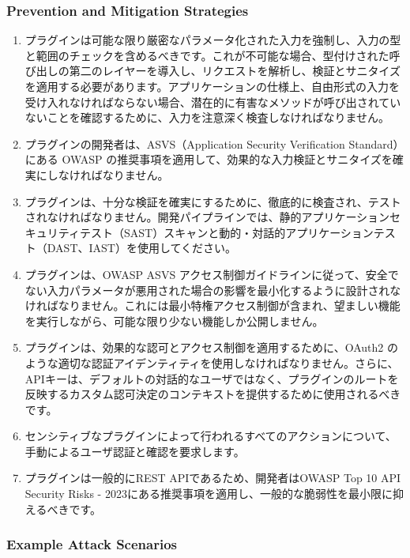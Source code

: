 \documentclass[
]{article}
\providecommand{\tightlist}{%
  \setlength{\itemsep}{0pt}\setlength{\parskip}{0pt}}
\begin{document}
\subsubsection{Prevention and Mitigation
Strategies}\label{prevention-and-mitigation-strategies}

\begin{enumerate}
\def\labelenumi{\arabic{enumi}.}
\tightlist
\item
  プラグインは可能な限り厳密なパラメータ化された入力を強制し、入力の型と範囲のチェックを含めるべきです。これが不可能な場合、型付けされた呼び出しの第二のレイヤーを導入し、リクエストを解析し、検証とサニタイズを適用する必要があります。アプリケーションの仕様上、自由形式の入力を受け入れなければならない場合、潜在的に有害なメソッドが呼び出されていないことを確認するために、入力を注意深く検査しなければなりません。
\item
  プラグインの開発者は、ASVS（Application Security Verification
  Standard）にある OWASP
  の推奨事項を適用して、効果的な入力検証とサニタイズを確実にしなければなりません。
\item
  プラグインは、十分な検証を確実にするために、徹底的に検査され、テストされなければなりません。開発パイプラインでは、静的アプリケーションセキュリティテスト（SAST）スキャンと動的・対話的アプリケーションテスト（DAST、IAST）を使用してください。
\item
  プラグインは、OWASP ASVS
  アクセス制御ガイドラインに従って、安全でない入力パラメータが悪用された場合の影響を最小化するように設計されなければなりません。これには最小特権アクセス制御が含まれ、望ましい機能を実行しながら、可能な限り少ない機能しか公開しません。
\item
  プラグインは、効果的な認可とアクセス制御を適用するために、OAuth2
  のような適切な認証アイデンティティを使用しなければなりません。さらに、APIキーは、デフォルトの対話的なユーザではなく、プラグインのルートを反映するカスタム認可決定のコンテキストを提供するために使用されるべきです。
\item
  センシティブなプラグインによって行われるすべてのアクションについて、手動によるユーザ認証と確認を要求します。
\item
  プラグインは一般的にREST APIであるため、開発者はOWASP Top 10 API
  Security Risks -
  2023にある推奨事項を適用し、一般的な脆弱性を最小限に抑えるべきです。
\end{enumerate}

\subsubsection{Example Attack Scenarios}\label{example-attack-scenarios}
\end{document}
